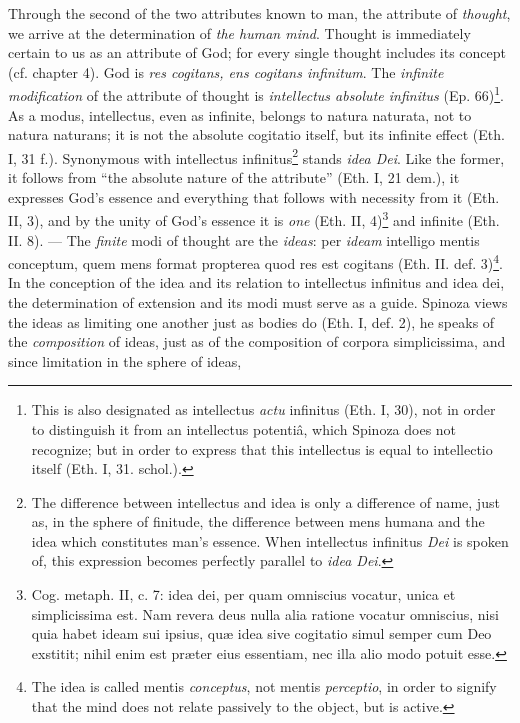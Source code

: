 \documentclass[12pt,a4paper,openany]{book}
\newcommand{\opage}[1]{\marginnote{\footnotesize\textit{[#1]}}}
\begin{document}
Through the second of the two attributes known to man,
the attribute of \emph{thought}, we arrive at the determination
of \emph{the human mind}. Thought is immediately
certain to us as an attribute of God; for every single thought includes its
concept (cf. chapter 4). God is \emph{res cogitans, ens cogitans
infinitum}. The \emph{infinite modification} of the attribute of thought
is \emph{intellectus absolute
\opage{83}\setcounter{footnote}{0}infinitus} (Ep. 66)\footnote{This is also designated as intellectus
\emph{actu} infinitus (Eth. I, 30), not in order to distinguish it from an
intellectus potentiâ, which Spinoza does not recognize; but
in order to express that this intellectus is equal to intellectio itself
(Eth. I, 31. schol.).}. As a modus, intellectus, even
as infinite, belongs to natura naturata, not to natura naturans;
it is not the absolute cogitatio itself, but its infinite
effect (Eth. I, 31 f.). Synonymous with intellectus
infinitus\footnote{The difference between intellectus and idea is only
a difference of name, just as, in the sphere of finitude, the difference
between mens humana and the idea which constitutes man's
essence. When intellectus infinitus \emph{Dei} is spoken of, this
expression becomes perfectly parallel to \emph{idea Dei}.} stands \emph{idea
Dei}. Like the former, it follows from ``the absolute nature of the attribute''
(Eth. I, 21 dem.), it expresses God's essence and everything that
follows with necessity from it (Eth. II, 3), and by the unity of God's
essence it is \emph{one} (Eth. II, 4)\footnote{Cog. metaph. II,
c. 7: idea dei, per quam omniscius vocatur, unica et
simplicissima est. Nam revera deus nulla alia ratione vocatur
omniscius, nisi quia habet ideam sui ipsius, quæ idea sive
cogitatio simul semper cum Deo exstitit; nihil enim est præter
eius essentiam, nec illa alio modo potuit esse.} and infinite
(Eth. II. 8). --- The \emph{finite} modi of thought are the \emph{ideas}: per
\emph{ideam} intelligo mentis conceptum, quem mens format propterea
quod res est cogitans (Eth. II. def. 3)\footnote{The idea is called
mentis \emph{conceptus}, not mentis \emph{perceptio}, in order to signify that
the mind does not relate passively to the object, but is active.}.
In the conception of the idea and its relation to intellectus infinitus
and idea dei, the determination of extension and its modi must
serve as a guide. Spinoza views the ideas as limiting
one another just as bodies do (Eth. I, def. 2), he speaks of
the \emph{composition} of ideas, just as of the composition of
corpora simplicissima, and since limitation in the sphere of ideas,
\end{document}
